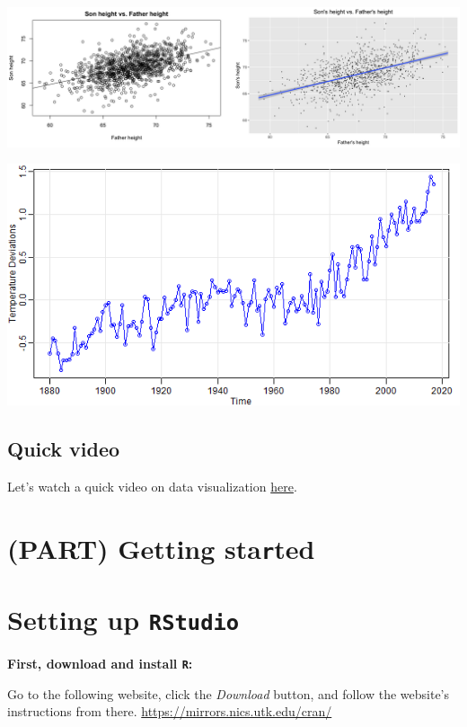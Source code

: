 \documentclass[
]{book}
\begin{document}
\includegraphics{img/vish.png}

\includegraphics{img/visi.png}

\hypertarget{quick-video}{%
\section{Quick video}\label{quick-video}}

Let's watch a quick video on data visualization \href{https://www.youtube.com/watch?v=AdSZJzb-aX8}{here}.

\hypertarget{part-getting-started}{%
\chapter*{\texorpdfstring{(PART) Getting sta\texttt{r}ted}{(PART) Getting started}}\label{part-getting-started}}

\hypertarget{setting-up-rstudio}{%
\chapter{\texorpdfstring{Setting up \texttt{RStudio}}{Setting up RStudio}}\label{setting-up-rstudio}}

\textbf{First, download and install \texttt{R}: }

Go to the following website, click the \emph{Download} button, and follow the website's instructions from there.
\url{https://mirrors.nics.utk.edu/cran/}
\end{document}
